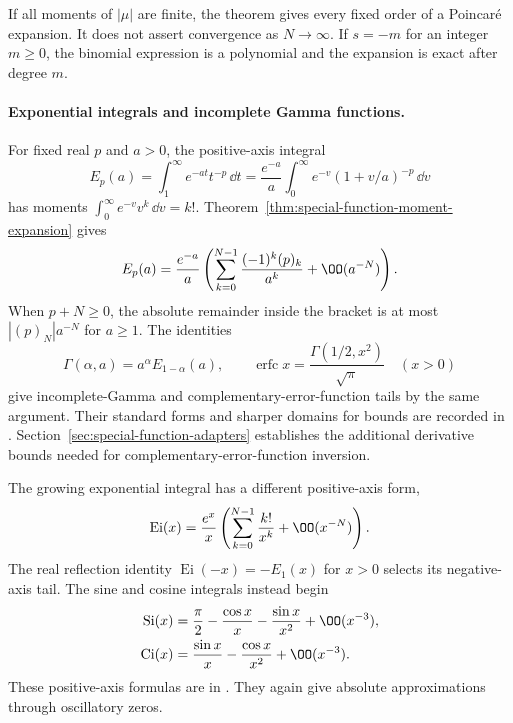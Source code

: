 If all moments of $|\mu|$ are finite, the theorem gives every fixed
order of a Poincar\'e expansion. It does not assert convergence as
$N\to\infty$. If $s=-m$ for an integer $m\ge0$, the binomial expression
is a polynomial and the expansion is exact after degree $m$.

\paragraph{Exponential integrals and incomplete Gamma functions.}
For fixed real $p$ and $a>0$, the positive-axis integral
\[
 E_p(a)=\int_1^\infty e^{-at}t^{-p}\,\dd t
       =\frac{e^{-a}}a\int_0^\infty
                  e^{-v}(1+v/a)^{-p}\,\dd v
\]
has moments $\int_0^\infty e^{-v}v^k\,\dd v=k!$.
Theorem~\ref{thm:special-function-moment-expansion} gives
\begin{equation}
 E_p(a)=\frac{e^{-a}}a
       \left(\sum_{k=0}^{N-1}\frac{(-1)^k(p)_k}{a^k}
                   +\OO(a^{-N})\right).
 \label{eq:special-function-exponential-integral}
\end{equation}
When $p+N\ge0$, the absolute remainder inside the bracket is at most
$|(p)_N|a^{-N}$ for $a\ge1$.
The identities
\[
 \Gamma(\alpha,a)=a^\alpha E_{1-\alpha}(a),\qquad
 \operatorname{erfc}x=\frac{\Gamma(1/2,x^2)}{\sqrt{\pi}}
       \quad(x>0)
\]
give incomplete-Gamma and complementary-error-function tails by the
same argument. Their standard forms and sharper domains for bounds
are recorded in \cite[\S\S8.11(i), 7.12(i)]{dlmf}.
Section~\ref{sec:special-function-adapters} establishes the additional
derivative bounds needed for complementary-error-function inversion.

The growing exponential integral has a different positive-axis form,
\begin{equation}
 \operatorname{Ei}(x)=\frac{e^x}{x}
       \left(\sum_{k=0}^{N-1}\frac{k!}{x^k}+\OO(x^{-N})\right).
 \label{eq:special-function-growing-exponential-integral}
\end{equation}
The real reflection identity
$\operatorname{Ei}(-x)=-E_1(x)$ for $x>0$ selects its negative-axis
tail. The sine and cosine integrals instead begin
\begin{equation}
\begin{aligned}
 \operatorname{Si}(x)&=\frac{\pi}{2}-\frac{\cos x}{x}
                              -\frac{\sin x}{x^2}+\OO(x^{-3}),\\
 \operatorname{Ci}(x)&=\frac{\sin x}{x}
                              -\frac{\cos x}{x^2}+\OO(x^{-3}).
\end{aligned}
\label{eq:special-function-oscillatory-integrals}
\end{equation}
These positive-axis formulas are in \cite[\S6.12]{dlmf}.
They again give absolute approximations through oscillatory zeros.

